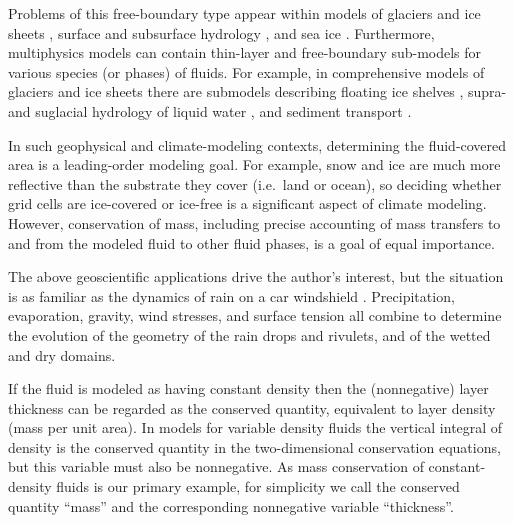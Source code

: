 \documentclass[final,leqno,onefignum,onetabnum]{siamltex1213bueler}
\begin{document}
%

Problems of this free-boundary type appear within models of glaciers and ice sheets \cite{Bueler2016,CalvoDuranyVazquez2000,Calvoetal2002,DiazSchiavi1999,EgholmNielsen2010,JouvetBueler2012},  surface and subsurface hydrology \cite{AlonsoSantillanaDawson2008,Maxwelletal2014}, and sea ice \cite{LipscombHunke2004,Thorndikeetal1975}.  Furthermore, multiphysics models can contain thin-layer and free-boundary sub-models for various species (or phases) of fluids.  For example, in comprehensive models of glaciers and ice sheets there are submodels describing floating ice shelves \cite{Albrechtetal2011}, supra- and suglacial hydrology of liquid water \cite{Aschwandenetal2012,BuelervanPelt2015,Schoofetal2012}, and sediment transport \cite{Brinkerhoffetal2017}.

In such geophysical and climate-modeling contexts, determining the fluid-covered area is a leading-order modeling goal.  For example, snow and ice are much more reflective than the substrate they cover (i.e.~land or ocean), so deciding whether grid cells are ice-covered or ice-free is a significant aspect of climate modeling.  However, conservation of mass, including precise accounting of mass transfers to and from the modeled fluid to other fluid phases, is a goal of equal importance.

The above geoscientific applications drive the author's interest, but the situation is as familiar as the dynamics of rain on a car windshield \cite{Kondic2003}.  Precipitation, evaporation, gravity, wind stresses, and surface tension all combine to determine the evolution of the geometry of the rain drops and rivulets, and of the wetted and dry domains.

If the fluid is modeled as having constant density then the (nonnegative) layer thickness can be regarded as the conserved quantity, equivalent to layer density (mass per unit area).  In models for variable density fluids the vertical integral of density is the conserved quantity in the two-dimensional conservation equations, but this variable must also be nonnegative.  As mass conservation of constant-density fluids is our primary example, for simplicity we call the conserved quantity ``mass'' and the corresponding nonnegative variable ``thickness''.
\end{document}
